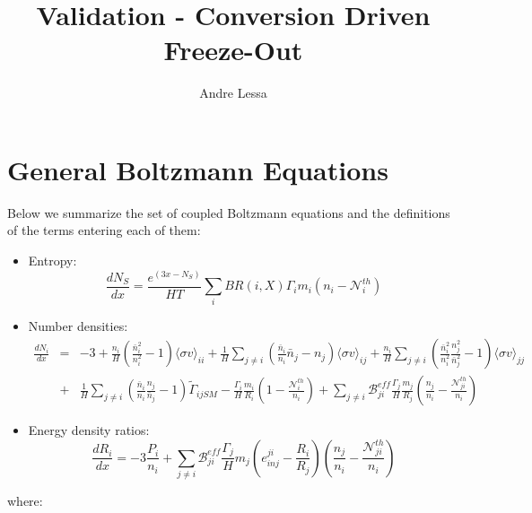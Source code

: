 \documentclass[preprint,notoc]{JHEP3}
\title{Validation - Conversion Driven Freeze-Out}
\author{Andre Lessa}
\begin{document}
\section{General Boltzmann Equations}

Below we summarize the set of coupled Boltzmann equations and the definitions of the terms
entering each of them:

\begin{itemize}
\item Entropy:
\begin{equation}
\frac{d N_S}{d x} = \frac{e^{(3 x - N_S)}}{HT} \sum_{i} BR(i,X) \Gamma_i m_i \left(n_i -
\mathcal{N}_{i}^{th} \right) \label{eq:Sfin}
\end{equation}
\item Number densities:
\begin{eqnarray}
\frac{d N_i}{d x} & = & -3
+ \frac{n_i}{H}\left( \frac{\bar{n}_i^2}{n_i^2} -1 \right) \langle \sigma v \rangle_{ii} 
+ \frac{1}{H} \sum_{j\neq i} \left( \frac{\bar{n}_i}{n_i} \bar{n}_j - n_j \right) \langle \sigma v \rangle_{ij}
+ \frac{n_i}{H} \sum_{j\neq i} \left(\frac{\bar{n}_i^2}{n_i^2}\frac{n_j^2}{\bar{n}_j^2}  - 1 \right) \langle \sigma v \rangle_{jj} \nonumber\\
&+& \frac{1}{H} \sum_{j\neq i} \left(\frac{\bar{n}_i}{n_i}\frac{n_j}{\bar{n}_j}  - 1\right)  \tilde{\Gamma}_{ijSM} 
 -  \frac{\Gamma_i}{H} \frac{m_i}{R_i}\left(1 - \frac{\mathcal{N}_{i}^{th}}{n_i} \right)
  +  \sum_{j \neq i} \mathcal{B}_{ji}^{eff} \frac{\Gamma_j}{H}
 \frac{m_j}{R_j}\left(\frac{n_j}{n_i} - \frac{\mathcal{N}_{ji}^{th}}{n_i}  \right)
\end{eqnarray}
\item Energy density ratios:
\begin{equation}
\frac{ d R_i}{d x} =   -3 \frac{P_i}{n_i} + \sum_{j \neq i} \mathcal{B}_{ji}^{eff}
\frac{\Gamma_j}{H} m_j \left( e_{inj}^{ji} - \frac{R_i}{R_j} \right) \left(\frac{n_j}{n_i} -
\frac{\mathcal{N}_{ji}^{th}}{n_i} \right)
\end{equation}
\end{itemize}
where:
\end{document}
